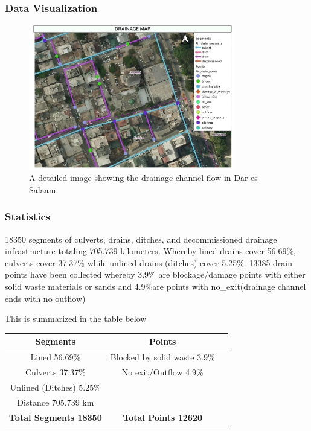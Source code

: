 \documentclass[a4paper,12pt,twoside]{article}
\begin{document}
\subsubsection{Data Visualization}

\begin{figure}[h]
	\color{RHgreen}\caption{A detailed image showing the drainage channel flow in Dar es Salaam.}
	\includegraphics[width=0.8\textwidth]{images/Drainage_Visualization.jpeg}
\end{figure}

\subsubsection{Statistics}
18350 segments of culverts, drains, ditches, and decommissioned drainage infrastructure totaling 705.739 kilometers. Whereby lined drains cover 56.69\%, culverts cover 37.37\% while unlined drains (ditches) cover 5.25\%.
13385 drain points have been collected whereby 3.9\% are blockage/damage points with either solid waste materials or sands and 4.9\%are  points with no\_exit(drainage channel ends with no outflow)

This is summarized in the table below

\begin{center}
	\begin{tabular}{|c|c|c|}
		\hline
		\bfseries Segments & \bfseries Points\\
		\hline
		Lined 56.69\% & Blocked by solid waste 3.9\%\\
		\hline
		Culverts 37.37\% & No exit/Outflow 4.9\%\\
		\hline
		Unlined (Ditches) 5.25\% & {}\\
		\hline
		Distance 705.739 km & {}\\
		\hline
		\bfseries Total Segments 18350 & \bfseries Total Points 12620\\
		\hline
	\end{tabular}
\end{center}
\end{document}
